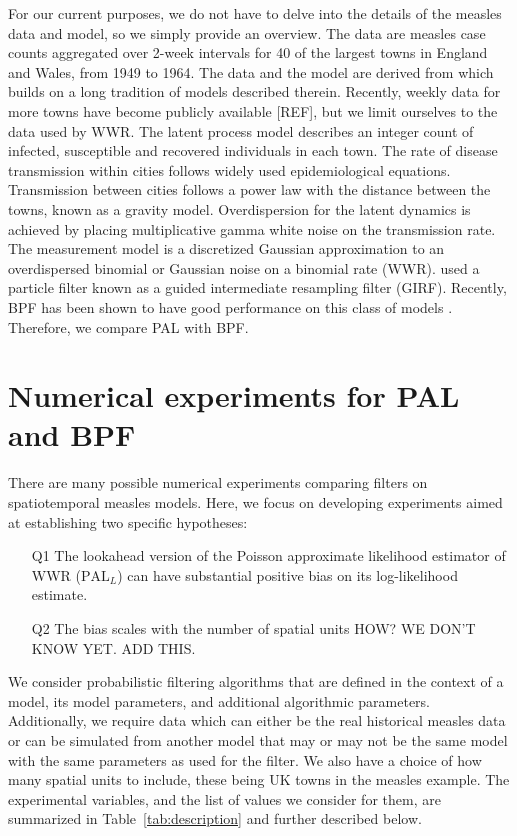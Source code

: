 \documentclass{article}
\newcommand\PALL{$\mathrm{PAL}_L$} %
\newcommand\eic[1]{{\color{Orange} #1}}
\begin{document}
For our current purposes, we do not have to delve into the details of the measles data and model, so we simply provide an overview.
The data are measles case counts aggregated over 2-week intervals for 40 of the largest towns in England and Wales, from 1949 to 1964.
The data and the model are derived from \citet{park20} which builds on a long tradition of models described therein.
Recently, weekly data for more towns have become publicly available [REF], but we limit ourselves to the data used by WWR. 
The latent process model describes an integer count of infected, susceptible and recovered individuals in each town.
The rate of disease transmission within cities follows widely used epidemiological equations.
Transmission between cities follows a power law with the distance between the towns, known as a gravity model.
Overdispersion for the latent dynamics is achieved by placing multiplicative gamma white noise on the transmission rate.
The measurement model is a discretized Gaussian approximation to an overdispersed binomial \citep{park20} or Gaussian noise on a binomial rate (WWR).
\citet{park20} used a particle filter known as a guided intermediate resampling filter (GIRF).
Recently, BPF has been shown to have good performance on this class of models \cite{ionides23-jasa,ionides24-sinica,ning23}.
Therefore, we compare PAL with BPF.





\section{Numerical experiments for PAL and BPF}

There are many possible numerical experiments comparing filters on spatiotemporal measles models. 
Here, we focus on developing experiments aimed at establishing two specific hypotheses:
\begin{enumerate}
\item[Q1] The lookahead version of the Poisson approximate likelihood estimator of WWR (\PALL) can have substantial positive bias on its log-likelihood estimate.

\item[Q2] The bias scales with the number of spatial units \eic{HOW? WE DON'T KNOW YET. ADD THIS}.
\end{enumerate}
We consider probabilistic filtering algorithms that are defined in the context of a model, its model parameters, and additional algorithmic parameters. 
Additionally, we require data which can either be the real historical measles data or can be simulated from another model that may or may not be the same model with the same parameters as used for the filter. 
We also have a choice of how many spatial units to include, these being UK towns in the measles example.
The experimental variables, and the list of values we consider for them, are summarized in Table~\ref{tab:description} and further described below.
\end{document}
